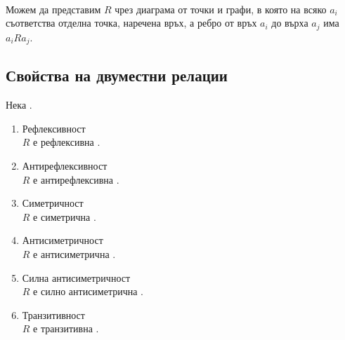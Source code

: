  \\
Можем да представим \(R\) чрез диаграма от точки и графи, в която на всяко \(a_i\) съответства отделна
точка, наречена връх, а ребро от връх \(a_i\) до върха \(a_j\) има \totw \(a_iRa_j\).


\subsection{Свойства на двуместни релации}
Нека .
\begin{enumerate}
    \item Рефлексивност \\
    \(R\) е рефлексивна \totw {}.

    \item Антирефлексивност \\
    \(R\) е антирефлексивна \totw {}.
    
    \item Симетричност \\
    \(R\) е симетрична \totw {}.

    \item Антисиметричност \\
    \(R\) е антисиметрична \totw {}.
    
    \item Силна антисиметричност \\
    \(R\) е силно антисиметрична \totw {}.
    
    \item Транзитивност \\
    \(R\) е транзитивна \totw {}.
    
\end{enumerate}

